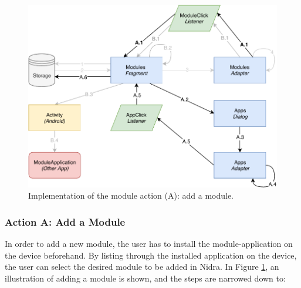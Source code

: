 \begin{figure}
    \centering
    \includegraphics[scale=0.7]{images/Module_ImpA.pdf}
    \caption{Implementation of the module action (A): add a module.}
    \label{fig:impl_modulesA}
\end{figure}

\subsubsection{Action A: Add a Module}
In order to add a new module, the user has to install the module-application on the device beforehand. By listing through the installed application on the device, the user can select the desired module to be added in Nidra. In Figure \ref{fig:impl_modulesA}, an illustration of adding a module is shown, and the steps are narrowed down to:



